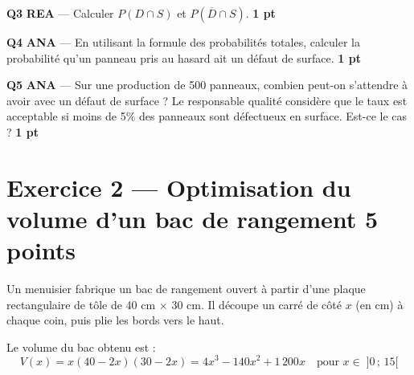 \documentclass[a4paper,11pt]{article}
\newcommand{\pts}[1]{\hfill\textcolor{gris}{\small\textbf{#1}}}
\newcommand{\comp}[1]{\colorbox{blue!10}{\scriptsize\textbf{#1}}}
\begin{document}
\textbf{Q3} \comp{REA} — Calculer $P(D \cap S)$ et $P(\overline{D} \cap S)$. \pts{1 pt}

\begin{reponsebox}[3cm]
\dotfill

\dotfill

\dotfill
\end{reponsebox}

\textbf{Q4} \comp{ANA} — En utilisant la formule des probabilités totales, calculer la probabilité qu'un panneau pris au hasard ait un défaut de surface. \pts{1 pt}

\begin{reponsebox}[3cm]
\dotfill

\dotfill

\dotfill
\end{reponsebox}

\textbf{Q5} \comp{ANA} — Sur une production de 500 panneaux, combien peut-on s'attendre à avoir avec un défaut de surface ? Le responsable qualité considère que le taux est acceptable si moins de 5\% des panneaux sont défectueux en surface. Est-ce le cas ? \pts{1 pt}

\begin{reponsebox}[3cm]
\dotfill

\dotfill

\dotfill
\end{reponsebox}

\newpage

\section*{Exercice 2 — Optimisation du volume d'un bac de rangement \pts{5 points}}

\begin{contextebox}
Un menuisier fabrique un bac de rangement ouvert à partir d'une plaque rectangulaire de tôle de 40 cm $\times$ 30 cm. Il découpe un carré de côté $x$ (en cm) à chaque coin, puis plie les bords vers le haut.

Le volume du bac obtenu est :
\[V(x) = x(40 - 2x)(30 - 2x) = 4x^3 - 140x^2 + 1\,200x \quad \text{pour } x \in \;]0\,;\,15[\]
\end{contextebox}
\end{document}
